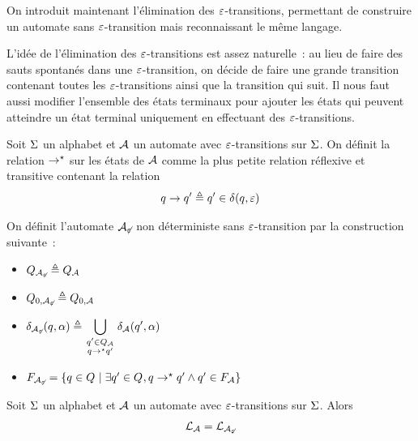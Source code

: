 On introduit maintenant l'élimination des $\varepsilon$-transitions, permettant de
construire un automate sans $\varepsilon$-transition mais reconnaissant le même
langage.

L'idée de l'élimination des $\varepsilon$-transitions est assez naturelle~: au lieu
de faire des sauts spontanés dans une $\varepsilon$-transition, on décide de faire une
grande transition contenant toutes les $\varepsilon$-transitions ainsi que la
transition qui suit. Il nous faut aussi modifier l'ensemble des états terminaux
pour ajouter les états qui peuvent atteindre un état terminal uniquement en
effectuant des $\varepsilon$-transitions.

\begin{definition}
  Soit $\Sigma$ un alphabet et $\mathcal{A}$ un automate avec $\varepsilon$-transitions sur
  $\Sigma$. On définit la relation $\to^{\mathord{\star}}$ sur les états de $\mathcal{A}$ comme
  la plus petite relation  réflexive et transitive contenant la relation
  \[q_{}\to q_{}' \triangleq q_{}' \in \delta_{}(q_{},\varepsilon)\]

  On définit l'automate $\mathcal{A}_{\not\varepsilon}$ non déterministe sans $\varepsilon$-transition
  par la construction suivante~:
  \begin{itemize}
  \item $Q_{\mathcal{A}_{\not\varepsilon}} \triangleq Q_{\mathcal{A}}$
  \item $Q_{0,\mathcal{A}_{\not\varepsilon}} \triangleq Q_{0,\mathcal{A}}$
  \item $\displaystyle\trAP{\varAuP{\nEwd}}(\varq,\varla) \defeq
    \bigcup_{\genfrac{}{}{0pt}{1}{\varq' \in \varQP{\varAuA}}{\varq\rtClot{\to}\varq'}}
    \trAP{\varAuA}(\varq',\varla)$
  \item $F_{\mathcal{A}_{\not\varepsilon}} =
    \left\{ q_{} \in Q_{} \;\middle\vert\; \exists q_{}'\in Q_{}, q_{} \to^{\mathord{\star}}q_{}' \land
            q_{}' \in F_{\mathcal{A}} \right\}$
  \end{itemize}
\end{definition}

\begin{proposition}\label{prop.epsi.equiv}
  Soit $\Sigma$ un alphabet et $\mathcal{A}$ un automate avec $\varepsilon$-transitions sur
  $\Sigma$. Alors
  \[\mathcal L_{\mathcal{A}} = \mathcal L_{\mathcal{A}_{\not\varepsilon}}\]
\end{proposition}

